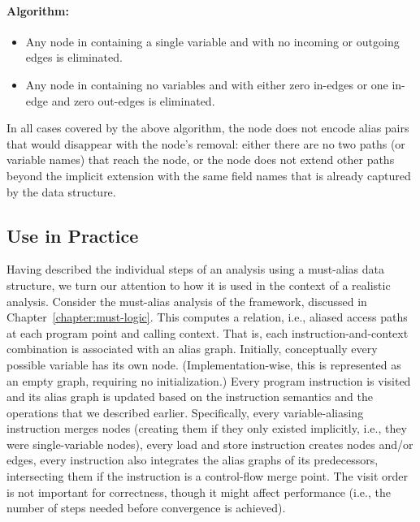 \paragraph{Algorithm: }
\begin{itemize}
\item Any node in  containing a single variable and with no incoming or outgoing edges is eliminated.

\item Any node in  containing no variables and with either zero in-edges or one in-edge and zero out-edges is eliminated.
\end{itemize}

In all cases covered by the above algorithm, the node does not encode alias pairs that would disappear with the node's removal: either there are no two paths (or variable names) that reach the node, or the node does not extend other paths beyond the implicit extension with the same field names that is already captured by the data structure.


\subsection{Use in Practice}

Having described the individual steps of an analysis using a must-alias data structure, we turn our attention to how it is used in the context of a realistic analysis. Consider the must-alias analysis of the \doop{} framework, discussed in Chapter~\ref{chapter:must-logic}. This computes a  relation, i.e., aliased access paths at each program point and calling context. That is, each instruction-and-context combination is associated with an alias graph. Initially, conceptually every possible variable has its own node. (Implementation-wise, this is represented as an empty graph, requiring no initialization.) Every program instruction is visited and its alias graph is updated based on the instruction semantics and the operations that we described earlier. Specifically, every variable-aliasing instruction merges nodes (creating them if they only existed implicitly, i.e., they were single-variable nodes), every load and store instruction creates nodes and/or edges, every instruction also integrates the alias graphs of its predecessors, intersecting them if the instruction is a control-flow merge point. The visit order is not important for correctness, though it might affect performance (i.e., the number of steps needed before convergence is achieved).

